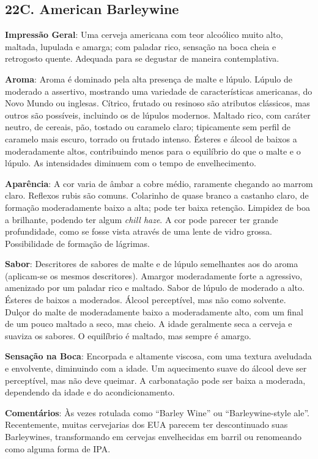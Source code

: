 \subsection*{22C. American Barleywine}
\textbf{Impressão Geral}: Uma cerveja americana com teor alcoólico muito alto, maltada, lupulada e amarga; com paladar rico, sensação na boca cheia e retrogosto quente. Adequada para se degustar de maneira contemplativa.

\textbf{Aroma}: Aroma é dominado pela alta presença de malte e lúpulo. Lúpulo de moderado a assertivo, mostrando uma variedade de características americanas, do Novo Mundo ou inglesas. Cítrico, frutado ou resinoso são atributos clássicos, mas outros são possíveis, incluindo os de lúpulos modernos. Maltado rico, com caráter neutro, de cereais, pão, tostado ou caramelo claro; tipicamente sem perfil de caramelo mais escuro, torrado ou frutado intenso. Ésteres e álcool de baixos a moderadamente altos, contribuindo menos para o equilíbrio do que o malte e o lúpulo. As intensidades diminuem com o tempo de envelhecimento.

\textbf{Aparência}: A cor varia de âmbar a cobre médio, raramente chegando ao marrom claro. Reflexos rubis são comuns. Colarinho de quase branco a castanho claro, de formação moderadamente baixo a alta; pode ter baixa retenção. Limpidez de boa a brilhante, podendo ter algum \textit{chill haze}. A cor pode parecer ter grande profundidade, como se fosse vista através de uma lente de vidro grossa. Possibilidade de formação de lágrimas.

\textbf{Sabor}: Descritores de sabores de malte e de lúpulo semelhantes aos do aroma (aplicam-se os mesmos descritores). Amargor moderadamente forte a agressivo, amenizado por um paladar rico e maltado. Sabor de lúpulo de moderado a alto. Ésteres de baixos a moderados. Álcool perceptível, mas não como solvente. Dulçor do malte de moderadamente baixo a moderadamente alto, com um final de um pouco maltado a seco, mas cheio. A idade geralmente seca a cerveja e suaviza os sabores. O equilíbrio é maltado, mas sempre é amargo.

\textbf{Sensação na Boca}: Encorpada e altamente viscosa, com uma textura aveludada e envolvente, diminuindo com a idade. Um aquecimento suave do álcool deve ser perceptível, mas não deve queimar. A carbonatação pode ser baixa a moderada, dependendo da idade e do acondicionamento.

\textbf{Comentários}: Às vezes rotulada como “Barley Wine” ou “Barleywine-style ale”. Recentemente, muitas cervejarias dos EUA parecem ter descontinuado suas Barleywines, transformando em cervejas envelhecidas em barril ou renomeando como alguma forma de IPA.

